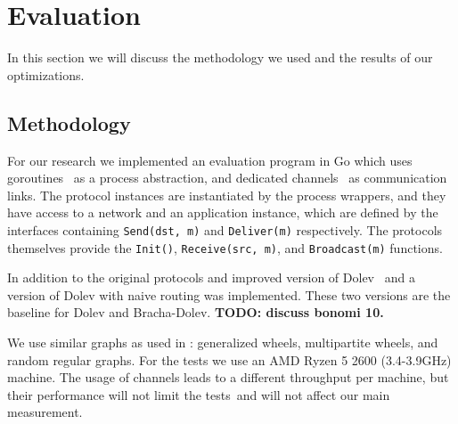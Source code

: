 \section{Evaluation}
\label{eval}



In this section we will discuss the methodology we used and the results of our optimizations.

\subsection{Methodology}
For our research we implemented an evaluation program in Go which uses goroutines~\cite{goroutines} as a process abstraction, and dedicated channels~\cite{channels} as communication links. The protocol instances are instantiated by the process wrappers, and they have access to a network and an application instance, which are defined by the interfaces containing \texttt{Send(dst, m)} and \texttt{Deliver(m)} respectively. The protocols themselves provide the \texttt{Init()}, \texttt{Receive(src, m)}, and \texttt{Broadcast(m)} functions.

In addition to the original protocols and improved version of Dolev~\cite{bonomi2019multihop} and a version of Dolev with naive routing was implemented. These two versions are the baseline for Dolev and Bracha-Dolev. 
\textbf{TODO: discuss bonomi 10.}

We use similar graphs as used in \cite{bonomi2021practical,bonomi2019multihop}: generalized wheels, multipartite wheels, and random regular graphs. For the tests we use an AMD Ryzen 5 2600 (3.4-3.9GHz) machine. The usage of channels leads to a different throughput per machine, but their performance will not limit the tests~\citationneeded and will not affect our main measurement.

